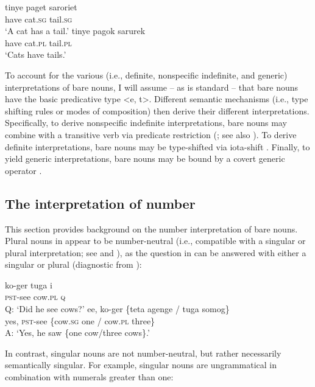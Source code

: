 \documentclass[output=paper,newtxmath,modfonts,nonflat,hidelinks]{langsci/langscibook}
\begin{document}
\ea   
  \ea \label{ex:landman:gensg}
     \gll tinye paget saroriet\\
          have cat.\textsc{sg} tail.\textsc{sg}\\ 
     \glt ‘A cat has a tail.’
  \ex \label{ex:landman:genpl}
     \gll tinye pagok sarurek\\
          have cat.\textsc{pl} tail.\textsc{pl}\\ 
     \glt ‘Cats have tails.’
  \z
\z 

To account for the various (i.e., definite, nonspecific indefinite, and generic) interpretations of bare nouns, I will assume -- as is standard -- that bare nouns have the basic predicative type <e, t>. Different semantic mechanisms (i.e., type shifting rules or modes of composition) then derive their different interpretations. Specifically, to derive nonspecific indefinite interpretations, bare nouns may combine with a transitive verb via predicate restriction (\citealt{Chung:2004}; see also \citealt{Carlson:1977}). To derive definite interpretations, bare nouns may be type-shifted via iota-shift \citep{Partee:1987}. Finally, to yield generic interpretations, bare nouns may be bound by a covert generic operator \citep{Krifka:1995}. 

\subsection{The interpretation of number}
\label{sec:landman:number}
This section provides background on the number interpretation of bare nouns. Plural nouns in  appear to be number-neutral (i.e., compatible with a singular or plural interpretation; see \citealt{Link:1983} and \citealt{Corbett:2000}), as the question in  can be answered with either a singular or plural  (diagnostic from \citealt{Link:1983}):

 \ea \label{ex:landman:15}
  \ea\label{ex:landman:barepluralquestion}
     \gll ko-ger tuga i\\
          \textsc{pst}-see cow.\textsc{pl} \textsc{q}\\ 
     \glt Q: ‘Did he see cows?’
\ex\label{ex:landman:answers}
     \gll ee, ko-ger \{teta agenge / tuga somog\}\\
             yes, \textsc{pst}-see \{cow.\textsc{sg} one / cow.\textsc{pl} three\}\\
      \glt A: ‘Yes, he saw \{one cow/three cows\}.’
\z 
\z

In contrast, singular nouns are not number-neutral, but rather necessarily semantically singular. For example, singular nouns are ungrammatical in combination with numerals greater than one: 
\end{document}
